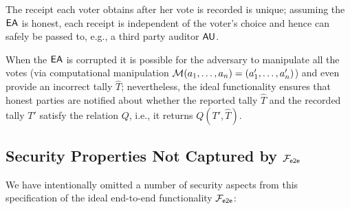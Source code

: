 \begin{claim}
  The receipt each voter obtains after her vote is recorded is unique;
  assuming the $\mathsf{EA}$ is honest, each receipt is independent of the
  voter's choice and hence can safely be passed to, e.g., a third
  party auditor $\mathsf{AU}$.
\end{claim}

\begin{claim}
  When the $\mathsf{EA}$ is corrupted it is possible for the adversary to
  manipulate all the votes (via computational manipulation
  $\mathcal{M}(a_1,\ldots, a_n) = (a_1', \ldots, a'_n)$) and even provide
  an incorrect tally $\hat{T}$; nevertheless, the ideal functionality
  ensures that honest parties are notified about whether the reported
  tally $\hat{T}$ and the recorded tally $T'$ satisfy the relation
  $Q$, i.e., it returns $Q(T',\hat{T})$.
\end{claim}

\subsection{Security Properties Not Captured by $\mathcal{F}_{\mathsf{e2e}}$}

We have intentionally omitted a number of security aspects from this
specification of the ideal end-to-end functionality $\mathcal{F}_{\mathsf{e2e}}$:

